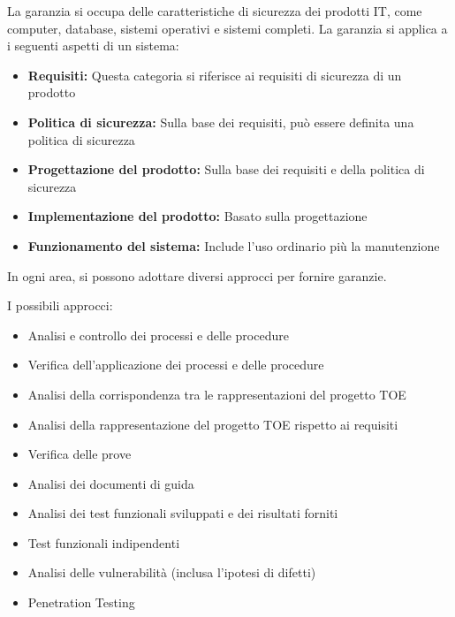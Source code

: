 La garanzia si occupa delle caratteristiche di sicurezza dei prodotti IT, come computer, database, sistemi operativi e sistemi completi. La garanzia si applica a i seguenti aspetti di un sistema:
\begin{itemize}
    \item \textbf{Requisiti:} Questa categoria si riferisce ai requisiti di sicurezza di un prodotto

    \item \textbf{Politica di sicurezza:} Sulla base dei requisiti, può essere definita una politica di sicurezza

    \item \textbf{Progettazione del prodotto:} Sulla base dei requisiti e della politica di sicurezza

    \item \textbf{Implementazione del prodotto:} Basato sulla progettazione

    \item \textbf{Funzionamento del sistema:} Include l'uso ordinario più la manutenzione
\end{itemize}

In ogni area, si possono adottare diversi approcci per fornire garanzie. 

\singlespacing

I possibili approcci:

\begin{itemize}
    \item Analisi e controllo dei processi e delle procedure
    
    \item Verifica dell'applicazione dei processi e delle procedure

    \item Analisi della corrispondenza tra le rappresentazioni del progetto TOE
    
    \item Analisi della rappresentazione del progetto TOE rispetto ai requisiti
    
    \item Verifica delle prove
    
    \item Analisi dei documenti di guida
    
    \item Analisi dei test funzionali sviluppati e dei risultati forniti
    
    \item Test funzionali indipendenti
    
    \item Analisi delle vulnerabilità (inclusa l'ipotesi di difetti)
    
    \item Penetration Testing
\end{itemize}


